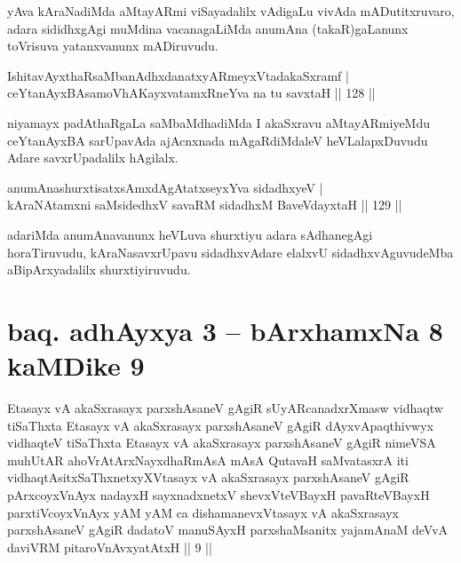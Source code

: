 \begin{artha}
yAva kAraNadiMda aMtayARmi viSayadalilx vAdigaLu vivAda mADutitxru\-varo, adara sididhxgAgi muMdina vacanagaLiMda anumAna (takaR)gaLanunx toVrisuva yatanxvanunx mADiruvudu.
\end{artha}

\begin{shl}
IshitavAyxthaRsaMbanAdhxdanatxyARmeyxVtadakaSxramf |\\
ceYtanAyxBAsamoVhAKayxvatamxRneYva na tu savxtaH \hfill || 128 ||
\end{shl}

\begin{artha}%
niyamayx padAthaRgaLa saMbaMdhadiMda I akaSxravu aMtayARmiyeMdu ceYtanAyxBA sarUpavAda ajAcnxnada mAgaRdiMdaleV heVLalapxDuvudu Adare savxrUpadalilx hAgilalx.
\end{artha}

\begin{shl}
anumAnashurxtisatxsAmxdAgAtatxseyxYva sidadhxyeV |\\
kAraNAtamxni saMsidedhxV savaRM sidadhxM BaveVdayxtaH \hfill || 129 ||
\end{shl}

\begin{artha}
adariMda anumAnavanunx heVLuva shurxtiyu adara sAdhanegAgi horaTiru\-vudu, kAraNasavxrUpavu sidadhxvAdare elalxvU sidadhxvAguvudeMba aBipArxyadalilx shurxtiyiruvudu.
\end{artha}

\section*{baq. adhAyxya 3 -- bArxhamxNa 8 kaMDike 9}


\begin{shl}
Etasayx vA akaSxrasayx parxshAsaneV gAgiR sUyARcanadxrXmasw vidhaqtw tiSaThxta Etasayx vA akaSxrasayx parxshAsaneV gAgiR dAyxvApaqthivwyx vidhaqteV tiSaThxta Etasayx vA akaSxrasayx parxshAsaneV gAgiR nimeVSA muhUtAR ahoVrAtArxNayxdhaRmAsA mAsA QutavaH saMvatasxrA iti vidhaqtAsitxSaThxnetxyXVtasayx vA akaSxrasayx parxshAsaneV gAgiR pArxcoyxV\s nAyx nadayxH sayxnadxnetxV shevxVteVBayxH pavaRteVBayxH parxtiVcoyxV\s nAyx yAM yAM ca dishamanevxVtasayx vA akaSxrasayx parxshAsaneV gAgiR dadatoV manuSAyxH parxshaMsanitx yajamAnaM deVvA daviVRM pitaroV\s nAvxyatAtxH || 9 ||
\end{shl}

